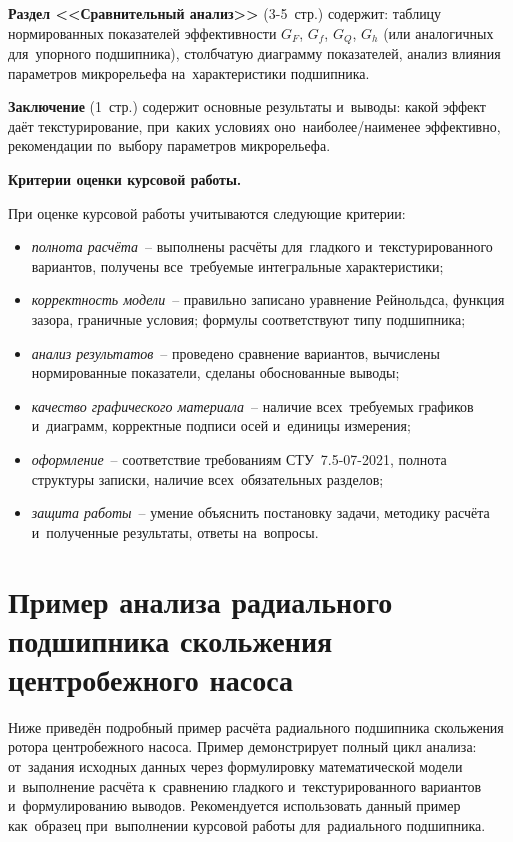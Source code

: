 \textbf{Раздел <<Сравнительный анализ>>} (3-5~стр.) содержит: таблицу нормированных показателей эффективности $G_F$, $G_f$, $G_Q$, $G_h$ (или аналогичных для~упорного подшипника), столбчатую диаграмму показателей, анализ влияния параметров микрорельефа на~характеристики подшипника.

\textbf{Заключение} (1~стр.) содержит основные результаты и~выводы: какой эффект даёт текстурирование, при~каких условиях оно~наиболее/наименее эффективно, рекомендации по~выбору параметров микрорельефа.

\textbf{Критерии оценки курсовой работы.}

При оценке курсовой работы учитываются следующие критерии:
\begin{itemize}
\item \textit{полнота расчёта}~-- выполнены расчёты для~гладкого и~текстурированного вариантов, получены все~требуемые интегральные характеристики;
\item \textit{корректность модели}~-- правильно записано уравнение Рейнольдса, функция зазора, граничные условия; формулы соответствуют типу подшипника;
\item \textit{анализ результатов}~-- проведено сравнение вариантов, вычислены нормированные показатели, сделаны обоснованные выводы;
\item \textit{качество графического материала}~-- наличие всех~требуемых графиков и~диаграмм, корректные подписи осей и~единицы измерения;
\item \textit{оформление}~-- соответствие требованиям СТУ~7.5-07-2021, полнота структуры записки, наличие всех~обязательных разделов;
\item \textit{защита работы}~-- умение объяснить постановку задачи, методику расчёта и~полученные результаты, ответы на~вопросы.
\end{itemize}


\section{Пример анализа радиального подшипника скольжения центробежного насоса}

Ниже приведён подробный пример расчёта радиального подшипника скольжения ротора центробежного насоса. Пример демонстрирует полный цикл анализа: от~задания исходных данных через формулировку математической модели и~выполнение расчёта к~сравнению гладкого и~текстурированного вариантов и~формулированию выводов. Рекомендуется использовать данный пример как~образец при~выполнении курсовой работы для~радиального подшипника.


